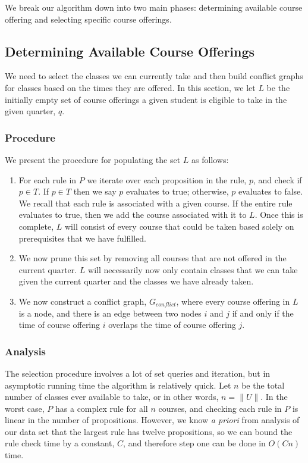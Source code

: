 \documentclass[11pt]{article} %
\begin{document}
We break our algorithm down into two main phases: determining available course
offering and selecting specific course offerings.

\subsection{Determining Available Course Offerings} We need to select the
classes we can currently take and then build conflict graphs for classes based
on the times they are offered. In this section, we let $L$ be the initially
empty set of course offerings a given student is eligible to take in the given
quarter, $q$. \\

\subsubsection{Procedure} We present the procedure for populating the set $L$ as
follows: \begin{enumerate} \item For each rule in $P$ we iterate over each
proposition in the rule, $p$, and check if $p \in T$. If $p \in T$ then we say
$p$ evaluates to true; otherwise, $p$ evaluates to false. We recall that each
rule is associated with a given course. If the entire rule evaluates to true,
then we add the course associated with it to $L$. Once this is complete, $L$
will consist of every course that could be taken based solely on prerequisites
that we have fulfilled.  \item We now prune this set by removing all courses
that are not offered in the current quarter. $L$ will necessarily now only
contain classes that we can take given the current quarter and the classes we
have already taken.  \item We now construct a conflict graph, $G_{conflict}$,
where every course offering in $L$ is a node, and there is an edge between two
nodes $i$ and $j$ if and only if the time of course offering $i$ overlaps the
time of course offering $j$.  \end{enumerate}

\subsubsection{Analysis} The selection procedure involves a lot of set queries
and iteration, but in asymptotic running time the algorithm is relatively quick.
Let $n$ be the total number of classes ever available to take, or in other
words, $n = \|U\|$. In the worst case, $P$ has a complex rule for all $n$
courses, and checking each rule in $P$ is linear in the number of propositions.
However, we know {\it a priori} from analysis of our data set that the largest
rule has twelve propositions, so we can bound the rule check time by a constant,
$C$, and therefore step one can be done in $O(Cn)$ time.
\end{document}
